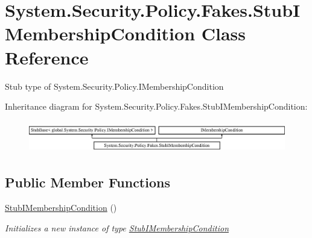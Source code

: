 \hypertarget{class_system_1_1_security_1_1_policy_1_1_fakes_1_1_stub_i_membership_condition}{\section{System.\-Security.\-Policy.\-Fakes.\-Stub\-I\-Membership\-Condition Class Reference}
\label{class_system_1_1_security_1_1_policy_1_1_fakes_1_1_stub_i_membership_condition}
}


Stub type of System.\-Security.\-Policy.\-I\-Membership\-Condition 


Inheritance diagram for System.\-Security.\-Policy.\-Fakes.\-Stub\-I\-Membership\-Condition\-:\begin{figure}[H]
\begin{center}
\leavevmode
\includegraphics[height=1.421320cm]{class_system_1_1_security_1_1_policy_1_1_fakes_1_1_stub_i_membership_condition}
\end{center}
\end{figure}
\subsection*{Public Member Functions}
\begin{DoxyCompactItemize}
\item 
\hyperlink{class_system_1_1_security_1_1_policy_1_1_fakes_1_1_stub_i_membership_condition_a03ebc572833233aceb05a9903c1fceda}{Stub\-I\-Membership\-Condition} ()
\begin{DoxyCompactList}\small\item\em Initializes a new instance of type \hyperlink{class_system_1_1_security_1_1_policy_1_1_fakes_1_1_stub_i_membership_condition}{Stub\-I\-Membership\-Condition}\end{DoxyCompactList}\end{DoxyCompactItemize}
